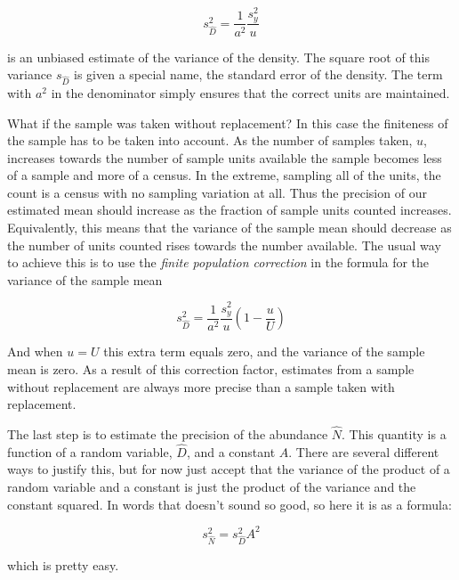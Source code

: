 \documentclass[]{book}
\theoremstyle{definition}
\theoremstyle{definition}
\theoremstyle{definition}
\theoremstyle{remark}
\begin{document}
\begin{equation}
  s_{\hat{D}}^2 = \frac{1}{a^2}\frac{s_y^2}{u}
  \label{eq:densityvarwr}
\end{equation}

is an unbiased estimate of the variance of the density. The square root
of this variance \(s_{\hat{D}}\) is given a special name, the standard
error of the density. The term with \(a^2\) in the denominator simply
ensures that the correct units are maintained.

What if the sample was taken without replacement? In this case the
finiteness of the sample has to be taken into account. As the number of
samples taken, \(u\), increases towards the number of sample units
available the sample becomes less of a sample and more of a census. In
the extreme, sampling all of the units, the count is a census with no
sampling variation at all. Thus the precision of our estimated mean
should increase as the fraction of sample units counted increases.
Equivalently, this means that the variance of the sample mean should
decrease as the number of units counted rises towards the number
available. The usual way to achieve this is to use the \emph{finite
population correction} in the formula for the variance of the sample
mean

\begin{equation}
  s_{\hat{D}}^2 = \frac{1}{a^2}\frac{s_y^2}{u}\left(1-\frac{u}{U}\right)
  \label{eq:densityvarwor}
\end{equation}

And when \(u = U\) this extra term equals zero, and the variance of the
sample mean is zero. As a result of this correction factor, estimates
from a sample without replacement are always more precise than a sample
taken with replacement.

The last step is to estimate the precision of the abundance \(\hat{N}\).
This quantity is a function of a random variable, \(\hat{D}\), and a
constant \(A\). There are several different ways to justify this, but
for now just accept that the variance of the product of a random
variable and a constant is just the product of the variance and the
constant squared. In words that doesn't sound so good, so here it is as
a formula:

\begin{equation}
  s_{\hat{N}}^2= s_{\hat{D}}^2 A^2
  \label{eq:abundancevar}
\end{equation}

which is pretty easy.
\end{document}
